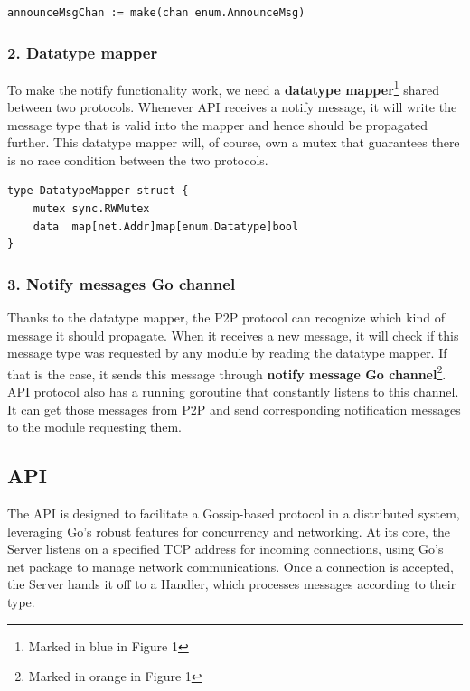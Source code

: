 \begin{lstlisting}
announceMsgChan := make(chan enum.AnnounceMsg)
\end{lstlisting}

\subsubsection{2. Datatype mapper}

To make the notify functionality work, we need a \textbf{datatype mapper}\footnote{Marked in blue in Figure 1} shared between two protocols. Whenever API receives a notify message, it will write the message type that is valid into the mapper and hence should be propagated further. This datatype mapper will, of course, own a mutex that guarantees there is no race condition between the two protocols.

\begin{lstlisting}
type DatatypeMapper struct {
    mutex sync.RWMutex
    data  map[net.Addr]map[enum.Datatype]bool
}
\end{lstlisting}

\subsubsection{3. Notify messages Go channel}

Thanks to the datatype mapper, the P2P protocol can recognize which kind of message it should propagate. When it receives a new message, it will check if this message type was requested by any module by reading the datatype mapper. If that is the case, it sends this message through \textbf{notify message Go channel}\footnote{Marked in orange in Figure 1}. API protocol also has a running goroutine that constantly listens to this channel. It can get those messages from P2P and send corresponding notification messages to the module requesting them. 

\subsection{API}

The API is designed to facilitate a Gossip-based protocol in a distributed system, leveraging Go's robust features for concurrency and networking. At its core, the Server listens on a specified TCP address for incoming connections, using Go's net package to manage network communications. Once a connection is accepted, the Server hands it off to a Handler, which processes messages according to their type.

